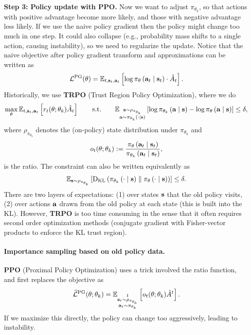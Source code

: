 \documentclass[11pt]{article}  %
\begin{document}
\textbf{Step 3: Policy update with PPO.} Now we want to adjust $\pi_{\theta_k}$, so that actions with positive advantage become more likely, and those with negative advantage less likely.
If we use the naive policy gradient then the policy might change too much in one step.
It could also collapse (e.g., probability mass shifts to a single action, causing instability), so we need to regularize the update.
Notice that the naive objective after policy gradient transform and approximations can be written as 
\begin{align*}
  \mathcal{L}^{\text{PG}}(\theta) = \mathbb{E}_{t, \mathbf{s}_t, \mathbf{a}_t}\left[\log \pi_{\theta}\left( \mathbf{a}_t \mid \mathbf{s}_t \right)\cdot \hat{A}_t\right].
\end{align*}
Historically, we use \textbf{TRPO} (Trust Region Policy Optimization), where we do 
\begin{align*}
  \max_{\theta} \mathbb{E}_{t, \mathbf{s}_t, \mathbf{a}_t}\left[r_t(\theta; 
  \theta_k) \hat{A}_t\right] \qquad \text{s.t.} \qquad \mathbb{E}_{\substack{\mathbf{s} \sim \rho_{\pi_{\theta_{k}}} \\ \mathbf{a} \sim \pi_{\theta_{k}}\left( \cdot \mid \mathbf{s} \right)}}\left[\log\pi_{\theta_k}\left( \mathbf{a} \mid \mathbf{s} \right) - \log\pi_{\theta}\left( \mathbf{a} \mid \mathbf{s} \right)\right] \leq \delta,
\end{align*}
where $\rho_{\pi_{\theta_{k}}}$ denotes the (on-policy) state distribution under $\pi_{\theta_{k}}$ and 
\begin{align*}
  o_t(\theta; \theta_k) := \frac{\pi_{\theta}\left( \mathbf{a}_t \mid \mathbf{s}_t \right)}{\pi_{\theta_{k}}\left( \mathbf{a}_t \mid \mathbf{s}_t \right)},
\end{align*}
is the ratio.
The constraint can also be written equivalently as 
\begin{align*}
  \mathbb{E}_{\mathbf{s} \sim \rho_{\pi_{\theta_k}} }\left[{\rm D}_{\text{KL}}\left( \pi_{\theta_{k}}\left( \cdot \mid \mathbf{s} \right) \parallel \pi_{\theta}\left( \cdot \mid \mathbf{s} \right) \right)\right] \leq \delta.
\end{align*}
There are two layers of expectations: (1) over states $\mathbf{s}$ that the old policy visits, (2) over actions $\mathbf{a}$ drawn from the old policy at each state (this is built into the KL).
However, \textbf{TRPO} is too time consuming in the sense that it often requires second order optimization methods (conjugate gradient with Fisher-vector products to enforce the KL trust region).


\paragraph{Importance sampling based on old policy data.} \textbf{PPO} (Proximal Policy Optimization) uses a trick involved the ratio function, and first replaces the objective as 
\begin{align*}
  \widehat{\mathcal{L}}^{\text{PG}}(\theta; \theta_k) = \mathbb{E}_{ \substack{t \\ \mathbf{s}_t \sim \rho_{\pi_{\theta_k}} \\ \mathbf{a}_t \sim \pi_{\theta_k}}}\left[o_t(\theta; \theta_k) \hat{A}^t\right].
\end{align*} 
If we maximize this directly, the policy can change too aggressively, leading to instability.
\end{document}

